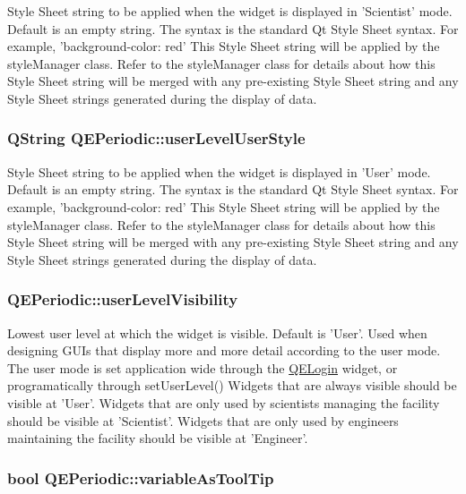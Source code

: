 \label{classQEPeriodic_a91a128c6ede1d9d392d1ab68e2499f77}
Style Sheet string to be applied when the widget is displayed in 'Scientist' mode. Default is an empty string. The syntax is the standard Qt Style Sheet syntax. For example, 'background-\/color: red' This Style Sheet string will be applied by the styleManager class. Refer to the styleManager class for details about how this Style Sheet string will be merged with any pre-\/existing Style Sheet string and any Style Sheet strings generated during the display of data. \hypertarget{classQEPeriodic_affb5eb56ea86898efa83f0491228e77c}{
\subsubsection[{userLevelUserStyle}]{\setlength{\rightskip}{0pt plus 5cm}QString QEPeriodic::userLevelUserStyle}}
\label{classQEPeriodic_affb5eb56ea86898efa83f0491228e77c}
Style Sheet string to be applied when the widget is displayed in 'User' mode. Default is an empty string. The syntax is the standard Qt Style Sheet syntax. For example, 'background-\/color: red' This Style Sheet string will be applied by the styleManager class. Refer to the styleManager class for details about how this Style Sheet string will be merged with any pre-\/existing Style Sheet string and any Style Sheet strings generated during the display of data. \hypertarget{classQEPeriodic_ac0f4016896d8c021a28bfa34586f35ab}{
\subsubsection[{userLevelVisibility}]{ QEPeriodic::userLevelVisibility}}
\label{classQEPeriodic_ac0f4016896d8c021a28bfa34586f35ab}
Lowest user level at which the widget is visible. Default is 'User'. Used when designing GUIs that display more and more detail according to the user mode. The user mode is set application wide through the \hyperlink{classQELogin}{QELogin} widget, or programatically through setUserLevel() Widgets that are always visible should be visible at 'User'. Widgets that are only used by scientists managing the facility should be visible at 'Scientist'. Widgets that are only used by engineers maintaining the facility should be visible at 'Engineer'. \hypertarget{classQEPeriodic_a9145a9978f353143f53559816a2232f8}{
\subsubsection[{variableAsToolTip}]{\setlength{\rightskip}{0pt plus 5cm}bool QEPeriodic::variableAsToolTip}}
